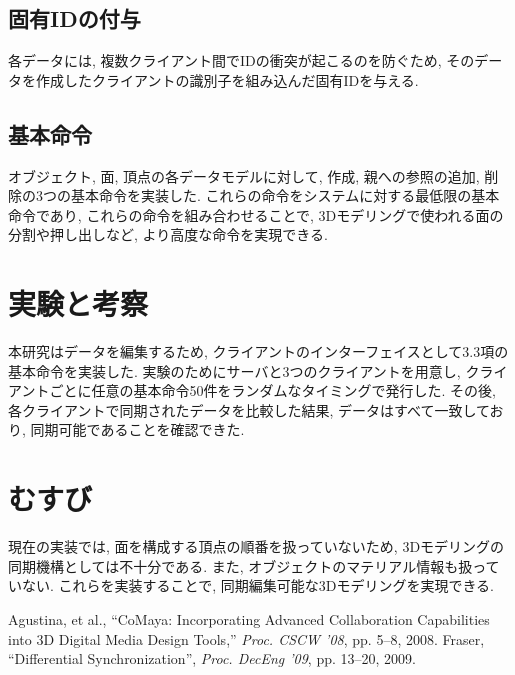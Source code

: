 \documentclass{AIabst}
\begin{document}
	\subsection{固有IDの付与}
	各データには, 複数クライアント間でIDの衝突が起こるのを防ぐため, そのデータを作成したクライアントの識別子を組み込んだ固有IDを与える.
	\subsection{基本命令}
	オブジェクト, 面, 頂点の各データモデルに対して, 作成, 親への参照の追加, 削除の3つの基本命令を実装した.
	これらの命令をシステムに対する最低限の基本命令であり, これらの命令を組み合わせることで, 3Dモデリングで使われる面の分割や押し出しなど, より高度な命令を実現できる.
\section{実験と考察}
本研究はデータを編集するため, クライアントのインターフェイスとして3.3項の基本命令を実装した.
実験のためにサーバと3つのクライアントを用意し, クライアントごとに任意の基本命令50件をランダムなタイミングで発行した.
 その後, 各クライアントで同期されたデータを比較した結果, データはすべて一致しており, 同期可能であることを確認できた.
\section{むすび}
 現在の実装では, 面を構成する頂点の順番を扱っていないため, 3Dモデリングの同期機構としては不十分である. また, オブジェクトのマテリアル情報も扱っていない.
これらを実装することで, 同期編集可能な3Dモデリングを実現できる.

\begin{thebibliography}{9}
	Agustina, et al., ``CoMaya: Incorporating Advanced Collaboration Capabilities into 3D Digital Media Design Tools,'' {\it Proc. CSCW '08}, pp. 5--8, 2008.
  Fraser,	``Differential Synchronization'',  {\it Proc. DecEng '09}, pp. 13--20, 2009.
\end{thebibliography}
\end{document}
